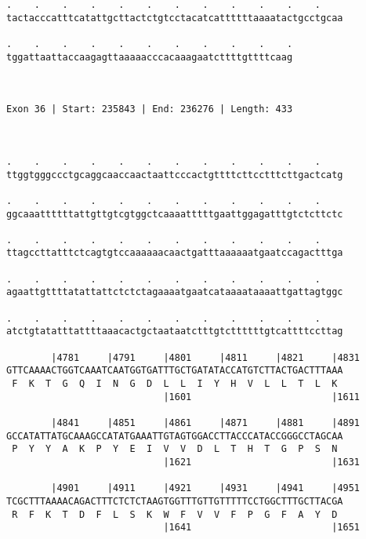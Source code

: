 \documentclass{article}
\begin{document}
\begin{Verbatim}
.    .    .    .    .    .    .    .    .    .    .    .    
tactacccatttcatattgcttactctgtcctacatcattttttaaaatactgcctgcaa
                                                            
.    .    .    .    .    .    .    .    .    .    .
tggattaattaccaagagttaaaaacccacaaagaatcttttgttttcaag
                                                   
                                                   
 
Exon 36 | Start: 235843 | End: 236276 | Length: 433



.    .    .    .    .    .    .    .    .    .    .    .    
ttggtgggccctgcaggcaaccaactaattcccactgttttcttcctttcttgactcatg
                                                            
.    .    .    .    .    .    .    .    .    .    .    .    
ggcaaattttttattgttgtcgtggctcaaaatttttgaattggagatttgtctcttctc
                                                            
.    .    .    .    .    .    .    .    .    .    .    .    
ttagccttatttctcagtgtccaaaaaacaactgatttaaaaaatgaatccagactttga
                                                            
.    .    .    .    .    .    .    .    .    .    .    .    
agaattgttttatattattctctctagaaaatgaatcataaaataaaattgattagtggc
                                                            
.    .    .    .    .    .    .    .    .    .    .    .    
atctgtatatttattttaaacactgctaataatctttgtcttttttgtcattttccttag
                                                            
        |4781     |4791     |4801     |4811     |4821     |4831
GTTCAAAACTGGTCAAATCAATGGTGATTTGCTGATATACCATGTCTTACTGACTTTAAA
 F  K  T  G  Q  I  N  G  D  L  L  I  Y  H  V  L  L  T  L  K 
                            |1601                         |1611
  
        |4841     |4851     |4861     |4871     |4881     |4891
GCCATATTATGCAAAGCCATATGAAATTGTAGTGGACCTTACCCATACCGGGCCTAGCAA
 P  Y  Y  A  K  P  Y  E  I  V  V  D  L  T  H  T  G  P  S  N 
                            |1621                         |1631
  
        |4901     |4911     |4921     |4931     |4941     |4951
TCGCTTTAAAACAGACTTTCTCTCTAAGTGGTTTGTTGTTTTTCCTGGCTTTGCTTACGA
 R  F  K  T  D  F  L  S  K  W  F  V  V  F  P  G  F  A  Y  D 
                            |1641                         |1651
  

\end{Verbatim}
\end{document}
